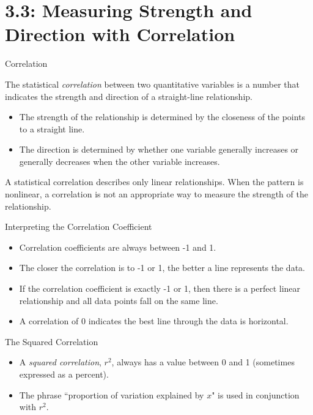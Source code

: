 \documentclass[Lecture.tex]{subfiles}
\begin{document}
\section{3.3: Measuring Strength and Direction with Correlation}




\begin{frame}{Correlation}
\begin{defn}
The statistical {\it correlation} between two quantitative variables is a number that indicates the strength and direction of a straight-line relationship.
\begin{itemize}
\item<1->
The strength of the relationship is determined by the closeness of the points to a straight line.
\item<2->
The direction is determined by whether one variable generally increases or generally decreases when the other variable increases.
\end{itemize}
\end{defn}\pause
\begin{rmk}
A statistical correlation describes only linear relationships. When the pattern is nonlinear, a correlation is not an appropriate way to measure the strength of the relationship.
\end{rmk}
\end{frame}

\begin{frame}{Interpreting the Correlation Coefficient}
\begin{itemize}
\item<1->
Correlation coefficients are always between -1 and 1.
\item<2->
The closer the correlation is to -1 or 1, the better a line represents the data.
\item<3->
If the correlation coefficient is exactly -1 or 1, then there is a perfect linear relationship and all data points fall on the same line.
\item<4->
A correlation of 0 indicates the best line through the data is horizontal.
\end{itemize}
\end{frame}

\begin{frame}{The Squared Correlation}
\begin{itemize}
\item<1->
A {\it squared correlation}, $r^2$, always has a value between 0 and 1 (sometimes expressed as a percent).
\item<2->
The phrase ``proportion of variation explained by $x$" is used in conjunction with $r^2$.
\end{itemize}
\end{frame}
\end{document}
